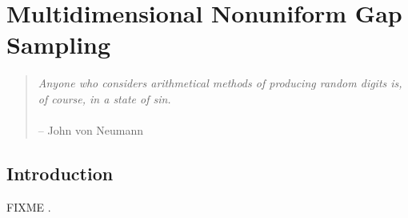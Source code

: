 
\chapter{Multidimensional Nonuniform Gap Sampling}

\begin{quote}
{\it
  Anyone who considers arithmetical methods of producing random digits is,
  of course, in a state of sin.}
\\\\
 -- John von Neumann
\end{quote}

\section{Introduction}

\begin{doublespace}
FIXME \cite{mobli:jmr2015}.
\end{doublespace}




